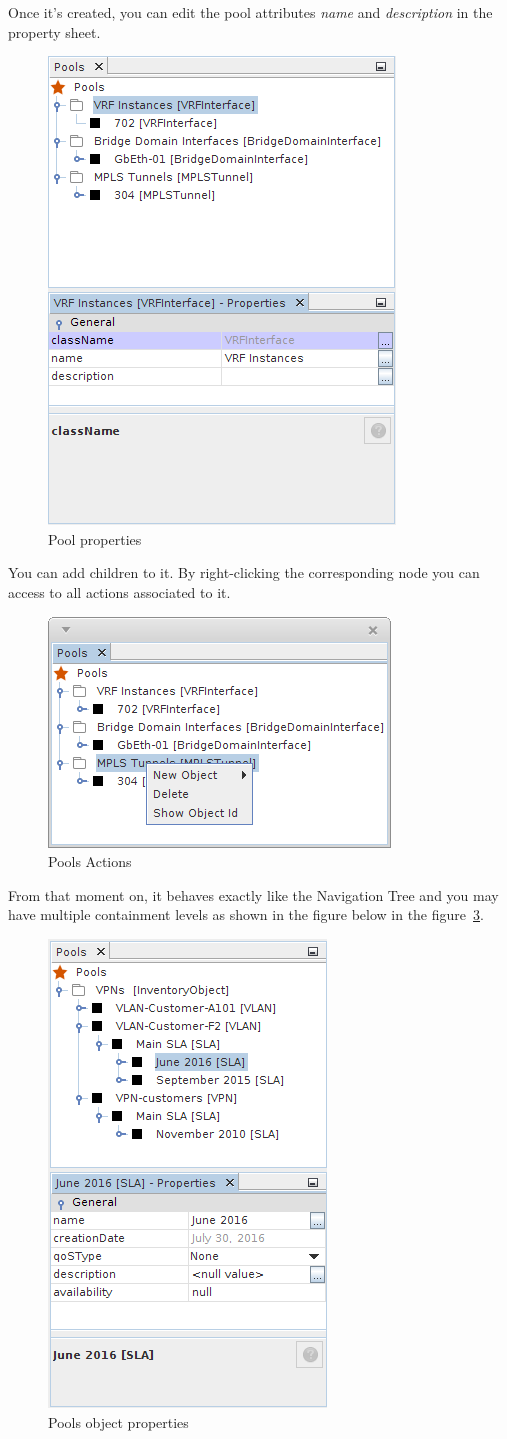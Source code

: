 \documentclass[a4paper]{article}
\begin{document}
	\newpage
	Once it's created, you can edit the pool attributes \textit{name} and \textit{description} in the property sheet.
	\begin{figure}[h!]
		\centering
		\includegraphics[width=0.5\linewidth]{img/pools_pool_properties.png}
		\caption{Pool properties}
		\label{fig:pools_pool_properties}
	\end{figure}
	
	You can add children to it. By right-clicking the corresponding node you can access to all actions associated to it. 
	\begin{figure}[h!]
		\centering
		\includegraphics[width=0.5\linewidth]{img/pools_pool_action.png}
		\caption{Pools Actions}
		\label{fig:pools_pool_action}
	\end{figure}
	
	\newpage
	From that moment on, it behaves exactly like the Navigation Tree and you may have multiple containment levels as shown in the figure below in the figure~\ref{fig:pools_pool_object_properties}.	
	\begin{figure}[h!]
		\centering
		\includegraphics[width=0.3\linewidth]{img/pools_pool_object_properties.png}
		\caption{Pools object properties}
		\label{fig:pools_pool_object_properties}
	\end{figure}
				
\end{document}
